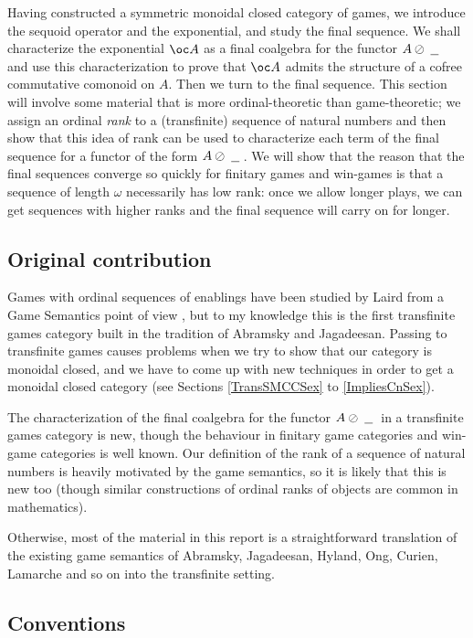 \documentclass[11pt]{article} %
\begin{document}
Having constructed a symmetric monoidal closed category of games, we introduce the sequoid operator and the exponential, and study the final sequence.  We shall characterize the exponential $\oc A$ as a final coalgebra for the functor $A\oslash\;\underline{\hspace{1.5ex}}\;$ and use this characterization to prove that $\oc A$ admits the structure of a cofree commutative comonoid on $A$.  Then we turn to the final sequence.  This section will involve some material that is more ordinal-theoretic than game-theoretic; we assign an ordinal \emph{rank} to a (transfinite) sequence of natural numbers and then show that this idea of rank can be used to characterize each term of the final sequence for a functor of the form $A\oslash\;\underline{\hspace{1.5ex}}\;$.  We will show that the reason that the final sequences converge so quickly for finitary games and win-games is that a sequence of length $\omega$ necessarily has low rank: once we allow longer plays, we can get sequences with higher ranks and the final sequence will carry on for longer.  

\subsection{Original contribution}

Games with ordinal sequences of enablings have been studied by Laird from a Game Semantics point of view \cite{LairdOrdinalGames}, but to my knowledge this is the first transfinite games category built in the tradition of Abramsky and Jagadeesan.  Passing to transfinite games causes problems when we try to show that our category is monoidal closed, and we have to come up with new techniques in order to get a monoidal closed category (see Sections \ref{TransSMCCSex} to \ref{ImpliesCnSex}).  

The characterization of the final coalgebra for the functor $A\oslash\;\underline{\hspace{1.5ex}}\;$ in a transfinite games category is new, though the behaviour in finitary game categories and win-game categories is well known.  Our definition of the rank of a sequence of natural numbers is heavily motivated by the game semantics, so it is likely that this is new too (though similar constructions of ordinal ranks of objects are common in mathematics).  

Otherwise, most of the material in this report is a straightforward translation of the existing game semantics of Abramsky, Jagadeesan, Hyland, Ong, Curien, Lamarche and so on into the transfinite setting.  

\subsection{Conventions}
\end{document}
